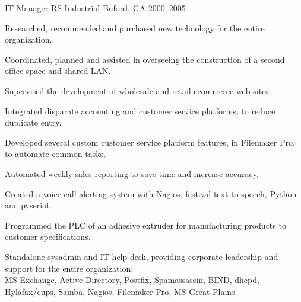 \begin{cventries}
  \cventry
    {IT Manager} %
    {RS Industrial} %
    {Buford, GA} %
    {2000--2005} %
    {
      \begin{cvitems} %
        \item {Researched, recommended and purchased new technology for the entire organization.}
        \item {Coordinated, planned and assisted in overseeing the construction of a second office space and shared LAN.}
        \item {Supervised the development of wholesale and retail ecommerce web sites.}
        \item {Integrated disparate accounting and customer service platforms, to reduce duplicate entry.}
        \item {Developed several custom customer service platform features, in Filemaker Pro, to automate common tasks.}
        \item {Automated weekly sales reporting to save time and increase accuracy.}
        \item {Created a voice-call alerting system with Nagios, festival text-to-speech, Python and pyserial.}
        \item {Programmed the PLC of an adhesive extruder for manufacturing products to customer specifications.}
      \end{cvitems}
    }
    {
      \begin{cventrysummary}
        Standalone sysadmin and IT help desk, providing corporate leadership and support for the entire organization: \\
        MS Exchange, Active Directory, Postfix, Spamassassin, BIND, dhcpd, Hylafax/cups, Samba, Nagios, Filemaker Pro, MS Great Plains.
      \end{cventrysummary}
    }

\end{cventries}

